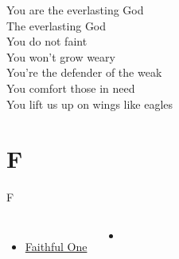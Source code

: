 \documentclass{beamer}
\begin{document}
{\begin{frame}{}
\end{frame}

\hypertarget{Everlasting God['Strength will rise']C}{}
\begin{frame}{}
\fontsize{ 18 }{ 23 }\selectfont

You are the everlasting God\\ 
The everlasting God\\ 
You do not faint\\ 
You won't grow weary\\ 
You're the defender of the weak\\ 
You comfort those in need\\ 
You lift us up on wings like eagles 

\end{frame}

}
\section{F}

\begin{frame}[t]{F}
\begin{columns}[t]
        \begin{itemize}
    \item \hyperlink{Faithful One[]}{Faithful One } \phantom{ 1 1 1 1 1 1 1 1 1 1 1}
\end{itemize}
        \begin{itemize}
            \item[] \phantom{1}\end{itemize}


\end{columns}

\end{frame}
\end{document}
